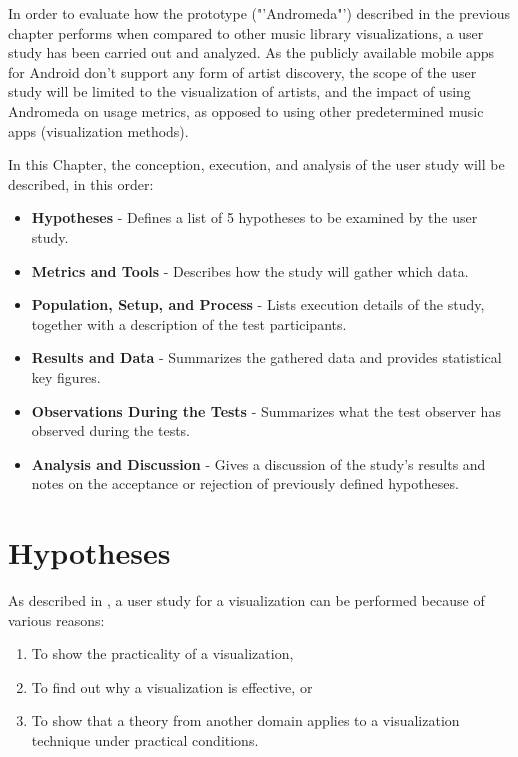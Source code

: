 In order to evaluate how the prototype ("'Andromeda"') described in the previous chapter performs when compared to other music library visualizations, a user study has been carried out and analyzed. As the publicly available mobile apps for Android don't support any form of artist discovery, the scope of the user study will be limited to the visualization of artists, and the impact of using Andromeda on usage metrics, as opposed to using other predetermined music apps (visualization methods).

In this Chapter, the conception, execution, and analysis of the user study will be described, in this order:

\begin{itemize}
	\item \textbf {Hypotheses} - Defines a list of 5 hypotheses to be examined by the user study.
	\item \textbf {Metrics and Tools} - Describes how the study will gather which data.
	\item \textbf {Population, Setup, and Process} - Lists execution details of the study, together with a description of the test participants.
	\item \textbf {Results and Data} - Summarizes the gathered data and provides statistical key figures.
	\item \textbf {Observations During the Tests} - Summarizes what the test observer has observed during the tests.
	\item \textbf {Analysis and Discussion} - Gives a discussion of the study's results and notes on the acceptance or rejection of previously defined hypotheses.
\end{itemize}

\section{Hypotheses}

As described in \cite{Christopher03thoughtson}, a user study for a visualization can be performed because of various reasons: 

\begin{enumerate}
	\item To show the practicality of a visualization,
	\item To find out why a visualization is effective, or
	\item To show that a theory from another domain applies to a visualization technique under practical conditions.
\end{enumerate}
	
